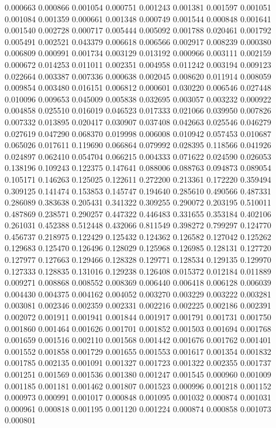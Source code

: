 0.000663
0.000866
0.001054
0.000751
0.001243
0.001381
0.001597
0.001051
0.001084
0.001359
0.000661
0.001348
0.000749
0.001544
0.000848
0.001641
0.001540
0.002728
0.000717
0.005444
0.005092
0.001788
0.020461
0.001792
0.005491
0.002521
0.043379
0.006618
0.006566
0.002917
0.008239
0.000380
0.006809
0.000991
0.001734
0.003129
0.013192
0.000966
0.003111
0.002159
0.000672
0.014253
0.011011
0.002351
0.004958
0.011242
0.003194
0.009123
0.022664
0.003387
0.007336
0.000638
0.002045
0.008620
0.011914
0.008059
0.009854
0.003480
0.016151
0.006812
0.000601
0.030220
0.006546
0.027448
0.010096
0.009653
0.045009
0.005838
0.032695
0.003057
0.003232
0.000922
0.004858
0.025510
0.016019
0.046523
0.017333
0.021066
0.039950
0.007826
0.007332
0.013895
0.020417
0.030907
0.037408
0.042663
0.025546
0.046279
0.027619
0.047290
0.068370
0.019998
0.006008
0.010942
0.057453
0.010687
0.065026
0.017611
0.119690
0.066864
0.079992
0.028395
0.118566
0.041926
0.024897
0.062410
0.054704
0.066215
0.004333
0.071622
0.024590
0.026053
0.138196
0.109243
0.122375
0.147641
0.088006
0.088763
0.094873
0.089054
0.105171
0.146263
0.125025
0.122611
0.272200
0.213361
0.172220
0.359494
0.309125
0.141474
0.153853
0.145747
0.194640
0.285610
0.490566
0.487331
0.286089
0.383638
0.205431
0.341322
0.309255
0.290072
0.203195
0.510011
0.487869
0.238571
0.290257
0.447322
0.446483
0.331655
0.353184
0.402106
0.261031
0.452388
0.512448
0.432066
0.811549
0.398272
0.799297
0.124770
0.456737
0.218975
0.122429
0.125432
0.124362
0.126582
0.127042
0.125262
0.129683
0.125470
0.126496
0.128029
0.125968
0.126985
0.128131
0.127720
0.127977
0.127663
0.129466
0.128328
0.129771
0.128534
0.129135
0.129970
0.127333
0.128835
0.131016
0.129238
0.126408
0.015372
0.012184
0.011889
0.009271
0.008868
0.008552
0.008369
0.006440
0.006418
0.006128
0.006039
0.004430
0.004375
0.004162
0.004052
0.003270
0.003229
0.003222
0.003281
0.003081
0.002346
0.002359
0.002331
0.002216
0.002225
0.002186
0.002391
0.002072
0.001911
0.001941
0.001844
0.001917
0.001791
0.001731
0.001750
0.001860
0.001464
0.001626
0.001701
0.001852
0.001503
0.001694
0.001768
0.001659
0.001516
0.002110
0.001568
0.001442
0.001676
0.001762
0.001401
0.001552
0.001858
0.001729
0.001655
0.001553
0.001617
0.001354
0.001832
0.001785
0.002135
0.001091
0.001327
0.001723
0.001322
0.002355
0.001737
0.001251
0.001569
0.001536
0.001380
0.001247
0.001545
0.000960
0.001009
0.001185
0.001181
0.001462
0.001807
0.001523
0.000996
0.001218
0.001152
0.000973
0.000991
0.001017
0.000848
0.001095
0.001032
0.000874
0.001031
0.000961
0.000818
0.001195
0.001120
0.001224
0.000874
0.000858
0.001073
0.000801
